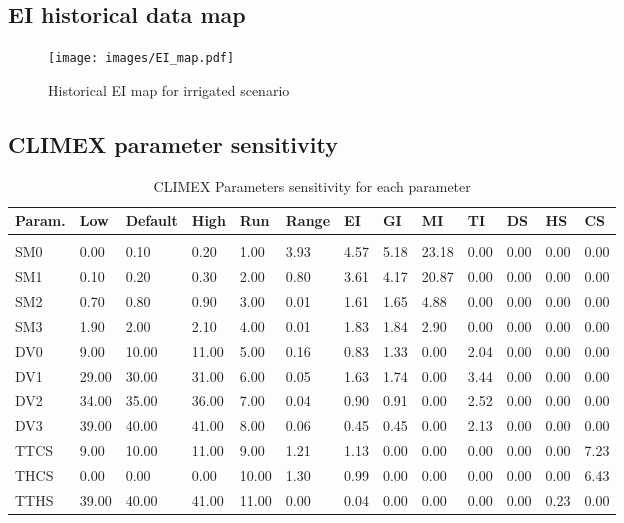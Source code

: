 \subsection{EI historical data map}
\begin{figure*}[!ht]
	\centering
	\texttt{[image: images/EI\_map.pdf]}
	\caption{Historical EI map for irrigated scenario}
	\label{fig:Historical EI map for irrigated scenario}
\end{figure*}


\pagebreak
\subsection{CLIMEX parameter sensitivity}
\begin{table}[ht]
\caption{CLIMEX Parameters sensitivity for each parameter}
\begin{tabular}{lllllllllllll}
\hline
Param. & Low   & Default & High  & Run   & Range & EI   & GI   & MI    & TI   & DS   & HS   & CS   \\ \hline
\\
SM0   & 0.00  & 0.10    & 0.20  & 1.00  & 3.93  & 4.57 & 5.18 & 23.18 & 0.00 & 0.00 & 0.00 & 0.00 \\
SM1   & 0.10  & 0.20    & 0.30  & 2.00  & 0.80  & 3.61 & 4.17 & 20.87 & 0.00 & 0.00 & 0.00 & 0.00 \\
SM2   & 0.70  & 0.80    & 0.90  & 3.00  & 0.01  & 1.61 & 1.65 & 4.88  & 0.00 & 0.00 & 0.00 & 0.00 \\
SM3   & 1.90  & 2.00    & 2.10  & 4.00  & 0.01  & 1.83 & 1.84 & 2.90  & 0.00 & 0.00 & 0.00 & 0.00 \\
DV0   & 9.00  & 10.00   & 11.00 & 5.00  & 0.16  & 0.83 & 1.33 & 0.00  & 2.04 & 0.00 & 0.00 & 0.00 \\
DV1   & 29.00 & 30.00   & 31.00 & 6.00  & 0.05  & 1.63 & 1.74 & 0.00  & 3.44 & 0.00 & 0.00 & 0.00 \\
DV2   & 34.00 & 35.00   & 36.00 & 7.00  & 0.04  & 0.90 & 0.91 & 0.00  & 2.52 & 0.00 & 0.00 & 0.00 \\
DV3   & 39.00 & 40.00   & 41.00 & 8.00  & 0.06  & 0.45 & 0.45 & 0.00  & 2.13 & 0.00 & 0.00 & 0.00 \\
TTCS  & 9.00  & 10.00   & 11.00 & 9.00  & 1.21  & 1.13 & 0.00 & 0.00  & 0.00 & 0.00 & 0.00 & 7.23 \\
THCS  & 0.00  & 0.00    & 0.00  & 10.00 & 1.30  & 0.99 & 0.00 & 0.00  & 0.00 & 0.00 & 0.00 & 6.43 \\
TTHS  & 39.00 & 40.00   & 41.00 & 11.00 & 0.00  & 0.04 & 0.00 & 0.00  & 0.00 & 0.00 & 0.23 & 0.00 \\

\end{tabular}
\end{table}
